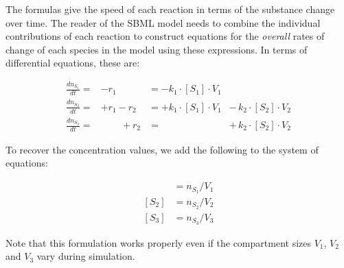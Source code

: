 The formulas give the speed of each reaction in terms of the
substance change over time.  The reader of the SBML model needs to
combine the individual contributions of each reaction to construct
equations for the \emph{overall} rates of change of each species
in the model using these expressions.  In terms of differential
equations, these are:
\begin{linenomath}
\begin{equation*}
  \begin{aligned}
  \frac{dn_{S_1}}{dt} = &- r_1                    &= - k_1 \cdot [S_1] \cdot V_1 &{}\\[4pt]
  \frac{dn_{S_2}}{dt} = &+ r_1 - r_2              &= + k_1 \cdot [S_1] \cdot V_1 &-\, k_2 \cdot [S_2] \cdot V_2\\[4pt]
  \frac{dn_{S_3}}{dt} = &\phantom{{}+ r_1} + r_2  &= \phantom{+ k_1 \cdot [S_2] \cdot V_1} &+\, k_2 \cdot [S_2] \cdot V_2
\end{aligned}
\end{equation*}
\end{linenomath}
To recover the concentration values, we add the following to the
system of equations:
\begin{linenomath}
\begin{align*}
  [S_1] &= n_{S_1}/V_1\\
  [S_2] &= n_{S_2}/V_2\\
  [S_3] &= n_{S_3}/V_3
\end{align*}
\end{linenomath}
Note that this formulation works properly even if the compartment
sizes $V_1$, $V_2$ and $V_3$ vary during simulation.  

